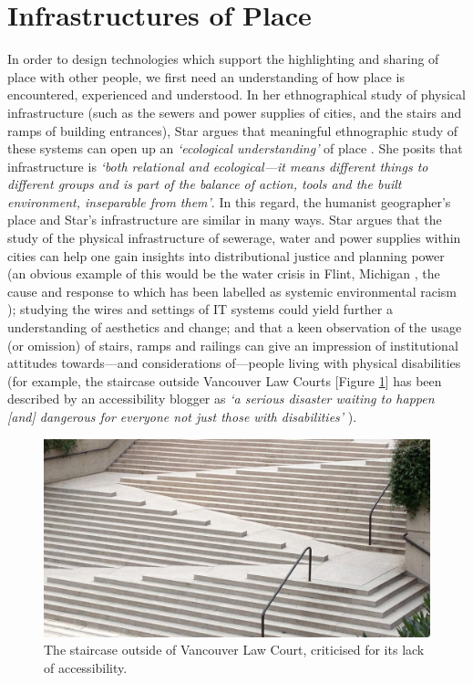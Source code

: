 \section{Infrastructures of Place}
\label{sec:InfrastructuresOfPlace}
In order to design technologies which support the highlighting and sharing of place with other people, we first need an understanding of how place is encountered, experienced and understood. In her ethnographical study of physical infrastructure (such as the sewers and power supplies of cities, and the stairs and ramps of building entrances), Star argues that meaningful ethnographic study of these systems can open up an \textit{`ecological understanding'} of place \citep{Star1999}. She posits that infrastructure is \textit{`both relational and ecological---it means different things to different groups and is part of the balance of action, tools and the built environment, inseparable from them'}. In this regard, the humanist geographer's place and Star's infrastructure are similar in many ways. Star argues that the study of the physical infrastructure of sewerage, water and power supplies within cities can help one gain insights into distributional justice and planning power (an obvious example of this would be the water crisis in Flint, Michigan \citep{Clark2018}, the cause and response to which has been labelled as systemic environmental racism \citep{MichiganCivilRightsCommission2017a}); studying the wires and settings of IT systems could yield further a understanding of aesthetics and change; and that a keen observation of the usage (or omission) of stairs, ramps and railings can give an impression of institutional attitudes towards---and considerations of---people living with physical disabilities (for example, the staircase outside Vancouver Law Courts [Figure \ref{fig:stairs}] has been described by an accessibility blogger as \textit{`a serious disaster waiting to happen [and] dangerous for everyone not just those with disabilities'} \citep{Wheeler-Hall2017}). 

\begin{figure}
  \centering
  \includegraphics[width=0.8\columnwidth]{images/chapter02/stairs.jpg}
  \caption[Vancouver Law Court staircase]{The staircase outside of Vancouver Law Court, criticised for its lack of accessibility.}
  \label{fig:stairs}
\end{figure}

